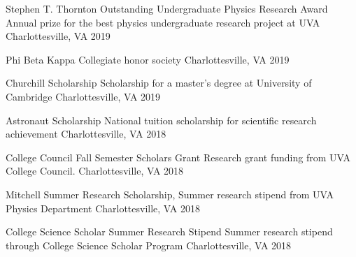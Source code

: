



\begin{cvhonors}
  \cvhonor
    {Stephen T. Thornton Outstanding Undergraduate Physics Research Award} %
    {Annual prize for the best physics undergraduate research project at UVA} %
    {Charlottesville, VA} %
    {2019} %

  \cvhonor
    {Phi Beta Kappa} %
    {Collegiate honor society} %
    {Charlottesville, VA} %
    {2019} %

  \cvhonor
    {Churchill Scholarship} %
    {Scholarship for a master’s degree at University of Cambridge} %
    {Charlottesville, VA} %
    {2019} %
    
  \cvhonor
    {Astronaut Scholarship} %
    {National tuition scholarship for scientific research achievement} %
    {Charlottesville, VA} %
    {2018} %
    
  \cvhonor
    {College Council Fall Semester Scholars Grant} %
    {Research grant funding from UVA College Council.} %
    {Charlottesville, VA} %
    {2018} %
    
  \cvhonor
    {Mitchell Summer Research Scholarship,} %
    {Summer research stipend from UVA Physics Department} %
    {Charlottesville, VA} %
    {2018} %
    
  \cvhonor
    { College Science Scholar Summer Research Stipend} %
    {Summer research stipend through College Science Scholar Program} %
    {Charlottesville, VA} %
    {2018} %
    

\end{cvhonors}
